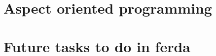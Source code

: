 \documentclass{article}
\begin{document}
\section{Aspect oriented programming}
\section{Future tasks to do in ferda}


\end{document}
